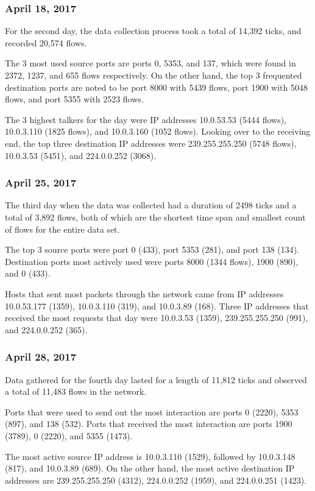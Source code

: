 \documentclass[journal]{IEEE/IEEEtran}
\begin{document}
\subsubsection{\textbf{April 18, 2017}}
For the second day, the data collection process took a total of 14,392 ticks, and recorded 20,574 flows.

The 3 most used source ports are ports 0, 5353, and 137, which were found in 2372, 1237, and 655 flows respectively. On the other hand, the top 3 frequented destination ports are noted to be port 8000 with 5439 flows, port 1900 with 5048 flows, and port 5355 with 2523 flows.

The 3 highest talkers for the day were IP addresses 10.0.53.53 (5444 flows), 10.0.3.110 (1825 flows), and 10.0.3.160 (1052 flows). Looking over to the receiving end, the top three destination IP addresses were 239.255.255.250 (5748 flows), 10.0.3.53 (5451), and 224.0.0.252 (3068).

\subsubsection{\textbf{April 25, 2017}}
The third day when the data was collected had a duration of 2498 ticks and a total of 3,892 flows, both of which are the shortest time span and smallest count of flows for the entire data set.

The top 3 source ports were port 0 (433), port 5353 (281), and port 138 (134). Destination ports most actively used were ports 8000 (1344 flows), 1900 (890), and 0 (433).

Hosts that sent most packets through the network came from IP addresses 10.0.53.177 (1359), 10.0.3.110 (319), and 10.0.3.89 (168). Three IP addresses that received the most requests that day were 10.0.3.53 (1359), 239.255.255.250 (991), and 224.0.0.252 (365).

\subsubsection{\textbf{April 28, 2017}}

Data gathered for the fourth day lasted for a length of 11,812 ticks and observed a total of 11,483 flows in the network.

Ports that were used to send out the most interaction are ports 0 (2220), 5353 (897), and 138 (532). Ports that received the most interaction are ports 1900 (3789), 0 (2220), and 5355 (1473).

The most active source IP address is 10.0.3.110 (1529), followed by 10.0.3.148 (817), and 10.0.3.89 (689). On the other hand, the most active destination IP addresses are 239.255.255.250 (4312), 224.0.0.252 (1959), and 224.0.0.251 (1423).
\end{document}
